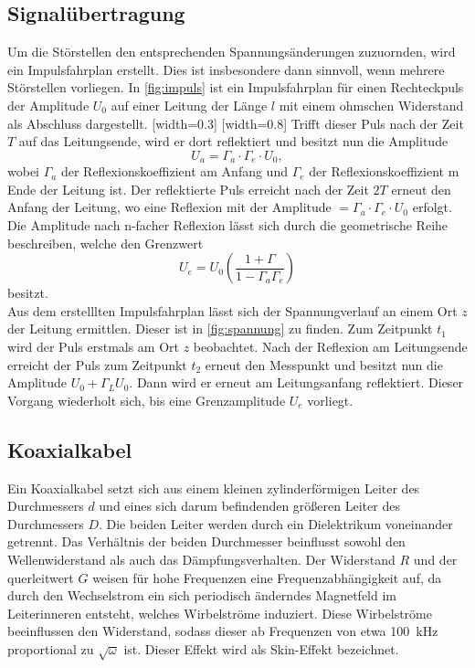 \subsection{Signalübertragung}
Um die Störstellen den entsprechenden Spannungsänderungen zuzuornden, wird ein Impulsfahrplan erstellt. Dies ist insbesondere dann sinnvoll, wenn mehrere Störstellen vorliegen. In \autoref{fig:impuls} ist ein Impulsfahrplan für einen Rechteckpuls der Amplitude $U_0$ auf einer Leitung der Länge $l$ mit einem ohmschen Widerstand als Abschluss dargestellt.
[width=0.3\textwidth]
[width=0.8\textwidth]
Trifft dieser Puls nach der Zeit $T$ auf das Leitungsende, wird er dort reflektiert und besitzt nun die Amplitude
\begin{equation}
  U_a=\Gamma_a \cdot \Gamma_e \cdot U_0,
\end{equation}
wobei $\Gamma_a$ der Reflexionskoeffizient am Anfang und $\Gamma_e$ der Reflexionskoeffizient m Ende der Leitung ist. Der reflektierte Puls erreicht nach der Zeit $2T$ erneut den Anfang der Leitung, wo eine Reflexion mit der Amplitude $=\Gamma_a \cdot \Gamma_e \cdot U_0$ erfolgt. Die Amplitude nach n-facher Reflexion lässt sich durch die geometrische Reihe beschreiben, welche den Grenzwert
\begin{equation}
  U_e=U_0\left(\frac{1+\Gamma}{1-\Gamma_a \Gamma_e}\right)
\end{equation}
besitzt.\\
Aus dem erstelllten Impulsfahrplan lässt sich der Spannungverlauf an einem Ort $z$ der Leitung ermittlen. Dieser ist in \autoref{fig:spannung} zu finden. Zum Zeitpunkt $t_1$ wird der Puls erstmals am Ort $z$ beobachtet. Nach der Reflexion am Leitungsende erreicht der Puls zum Zeitpunkt $t_2$ erneut den Messpunkt und besitzt nun die Amplitude $U_0 +\Gamma_L U_0$. Dann wird er erneut am Leitungsanfang reflektiert. Dieser Vorgang wiederholt sich, bis eine Grenzamplitude $U_e$ vorliegt.

\subsection{Koaxialkabel}
Ein Koaxialkabel setzt sich aus einem kleinen zylinderförmigen Leiter des Durchmessers $d$ und eines sich darum befindenden größeren Leiter des Durchmessers $D$. Die beiden Leiter werden durch ein Dielektrikum voneinander getrennt. Das Verhältnis der beiden Durchmesser beinflusst sowohl den Wellenwiderstand als auch das Dämpfungsverhalten. Der Widerstand $R$ und der querleitwert $G$ weisen für hohe Frequenzen eine Frequenzabhängigkeit auf, da durch den Wechselstrom ein sich periodisch änderndes Magnetfeld im Leiterinneren entsteht, welches Wirbelströme induziert. Diese Wirbelströme beeinflussen den Widerstand, sodass dieser ab Frequenzen von etwa \SI{100}{\kilo\hertz} proportional zu $\sqrt{\omega}$ ist. Dieser Effekt wird als Skin-Effekt bezeichnet.

